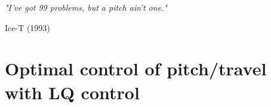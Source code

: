 \epigraph{\textit{"I've got 99 problems, but a pitch ain't one."}}{Ice-T (1993)}
\section{Optimal control of pitch/travel with LQ control}